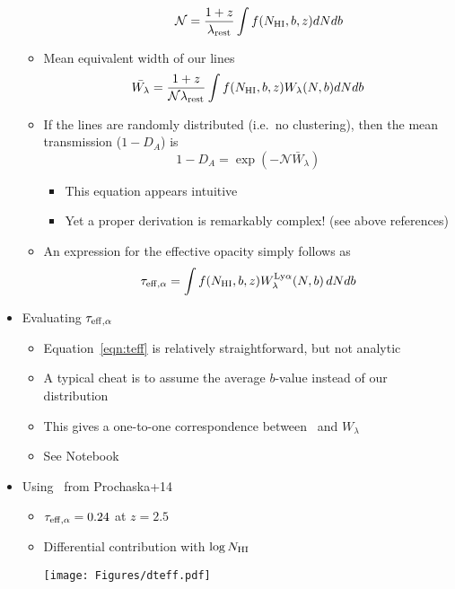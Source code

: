 \documentclass[12pt,letterpaper]{article}
\begin{document}
\begin{Aenumerate}
\begin{itemize}
\begin{itemize}
\begin{itemize}
	  		\begin{equation}
		  	\mathcal{N} = \frac{1+z}{\lambda_{\rm rest}} \int f(N_{\rm HI},b,z) dN db
	  		\end{equation}
			\end{itemize}
		\item Mean equivalent width of our lines
		  	\begin{equation}
		  	\bar{W_\lambda} = \frac{1+z}{\mathcal{N} \lambda_{\rm rest}} 
		  	\int f(N_{\rm HI},b,z) W_\lambda(N,b) dN db 
	  		\end{equation}
		\item If the lines are randomly distributed (i.e.\ no clustering),
		then the mean transmission ($1-D_A$) is
		\begin{equation}
		1-D_A = \exp (-\mathcal{N} \bar W_\lambda)
		\end{equation}
			\begin{itemize}
			\item This equation appears intuitive
			\item Yet a proper derivation is remarkably complex! (see above references)
			\end{itemize}
		\item An expression for the effective opacity simply follows as
		\begin{equation}
		\tau_{\rm eff, \alpha} = \int f(N_{\rm HI},b,z) 
		W^{\rm Ly\alpha}_\lambda(N,b) \, dN db 
		\label{eqn:teff}
		\end{equation}
		\end{itemize}
	\item Evaluating $\tau_{\rm eff,\alpha}$
		\begin{itemize}
		\item Equation~\ref{eqn:teff} is relatively straightforward, but
		not analytic
		\item A typical cheat is to assume the average $b$-value instead
		of our distribution
		\item This gives a one-to-one correspondence between \nhi\ and $W_\lambda$
		\item See Notebook
		\end{itemize}
	\item Using \fnhi\ from Prochaska+14
		\begin{itemize}
		\item $\tau_{\rm eff, \alpha} = 0.24$ at $z=2.5$
		\item Differential contribution with $\log N_{\rm HI}$

	\texttt{[image: Figures/dteff.pdf]}


\end{itemize}
\end{itemize}
\end{Aenumerate}
\end{document}
